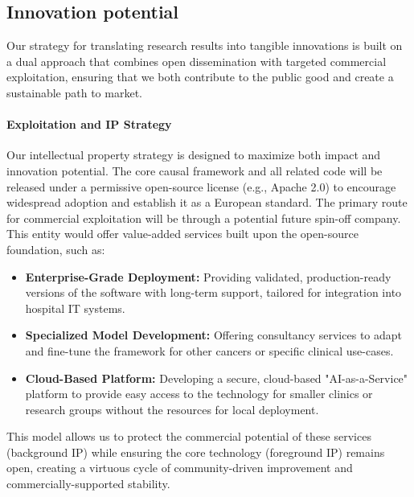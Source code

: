 \documentclass[11pt, a4paper]{article}
\begin{document}
\subsection{Innovation potential}
Our strategy for translating research results into tangible innovations is built on a dual approach that combines open dissemination with targeted commercial exploitation, ensuring that we both contribute to the public good and create a sustainable path to market.

\paragraph{Exploitation and IP Strategy}
Our intellectual property strategy is designed to maximize both impact and innovation potential. The core causal framework and all related code will be released under a permissive open-source license (e.g., Apache 2.0) to encourage widespread adoption and establish it as a European standard. The primary route for commercial exploitation will be through a potential future spin-off company. This entity would offer value-added services built upon the open-source foundation, such as:
\begin{itemize}
    \item \textbf{Enterprise-Grade Deployment:} Providing validated, production-ready versions of the software with long-term support, tailored for integration into hospital IT systems.
    \item \textbf{Specialized Model Development:} Offering consultancy services to adapt and fine-tune the framework for other cancers or specific clinical use-cases.
    \item \textbf{Cloud-Based Platform:} Developing a secure, cloud-based "AI-as-a-Service" platform to provide easy access to the technology for smaller clinics or research groups without the resources for local deployment.
\end{itemize}
This model allows us to protect the commercial potential of these services (background IP) while ensuring the core technology (foreground IP) remains open, creating a virtuous cycle of community-driven improvement and commercially-supported stability.
\end{document}
